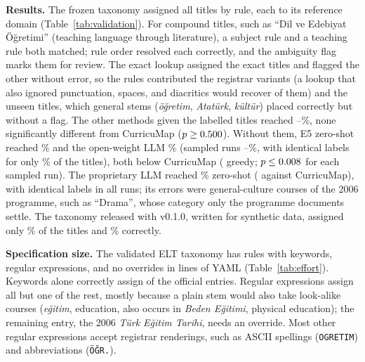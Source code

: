 \documentclass[preprint,12pt,a4paper]{elsarticle}
\begin{document}
\textbf{Results.} The frozen taxonomy assigned all \nTitles{} titles by rule, each to its reference domain (Table~\ref{tab:validation}). For \nAmbiguous{} compound titles, such as ``Dil ve Edebiyat \"O\u{g}retimi'' (teaching language through literature), a subject rule and a teaching rule both matched; rule order resolved each correctly, and the ambiguity flag marks them for review. The exact lookup assigned the \nExact{} exact titles and flagged the other \lookFlagged{} without error, so the rules contributed the \nVariant{} registrar variants (a lookup that also ignored punctuation, spaces, and diacritics would recover \nVariantLooseW{} of them) and the \nUnseenW{} unseen titles, which general stems (\emph{\"o\u{g}retim}, \emph{Atat\"urk}, \emph{k\"ult\"ur}) placed correctly but without a flag. The other methods given the labelled titles reached \listAccMin--\listAccMax\%, none significantly different from CurricuMap ($p \geq 0.500$). Without them, E5 zero-shot reached \eZSAcc\% and the open-weight LLM \gmZSgAcc\% (sampled runs \gmZSAccMin--\gmZSAccMax\%, with identical labels for only \gmZSIdentical\% of the titles), both below CurricuMap (\gmZSgPt{} greedy; $p \leq 0.008$ for each sampled run). The proprietary LLM reached \clZSAcc\% zero-shot (\clZSPt{} against CurricuMap), with identical labels in all \clZSRunsW{} runs; its \clZSWrongW{} errors were general-culture courses of the 2006 programme, such as ``Drama'', whose category only the programme documents settle. The taxonomy released with v0.1.0, written for synthetic data, assigned only \vOneCov\% of the titles and \vOneAcc\% correctly.

\begin{table}[t]
\centering\scriptsize

\caption{Size of the bundled taxonomy specifications; YAML lines exclude blank and comment lines. \texttt{elt\_yok\_2018\_v0.1.0} is the ELT taxonomy released with v0.1.0.}
\label{tab:effort}
\end{table}

\textbf{Specification size.} The validated ELT taxonomy has \eltRules{} rules with \eltKeywords{} keywords, \eltRegexes{} regular expressions, and no overrides in \eltYamllines{} lines of YAML (Table~\ref{tab:effort}). Keywords alone correctly assign \eltKwOnlyCorrect{} of the \eltKwOnlyEntries{} official entries. Regular expressions assign all but one of the rest, mostly because a plain stem would also take look-alike courses (\emph{e\u{g}itim}, education, also occurs in \emph{Beden E\u{g}itimi}, physical education); the remaining entry, the 2006 \emph{T\"urk E\u{g}itim Tarihi}, needs an override. Most other regular expressions accept registrar renderings, such as ASCII spellings (\texttt{OGRETIM}) and abbreviations (\texttt{\"O\u{G}R.}).
\end{document}
